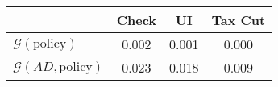 \begin{tabular}{@{}lccc@{}} 
\toprule 
                          & Check      & UI    & Tax Cut    \\  \midrule 
$\mathcal{G}(\text{policy})$ & 0.002  & 0.001  & 0.000     \\ 
$\mathcal{G}(AD,\text{policy})$ & 0.023  & 0.018  & 0.009     \\ 
\end{tabular}  
